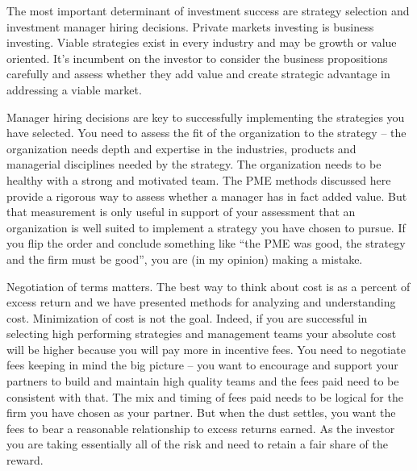 \documentclass[12pt,english]{article}\usepackage[]{graphicx}\usepackage[]{color}
\begin{document}
The most important determinant of investment success are strategy
selection and investment manager hiring decisions. Private markets
investing is business investing. Viable strategies exist in every
industry and may be growth or value oriented. It's incumbent on the
investor to consider the business propositions carefully and assess
whether they add value and create strategic advantage in addressing
a viable market.

Manager hiring decisions are key to successfully implementing the
strategies you have selected. You need to assess the fit of the organization
to the strategy -- the organization needs depth and expertise in
the industries, products and managerial disciplines needed by the
strategy. The organization needs to be healthy with a strong and motivated
team. The PME methods discussed here provide a rigorous way to assess
whether a manager has in fact added value. But that measurement is
only useful in support of your assessment that an organization is
well suited to implement a strategy you have chosen to pursue. If
you flip the order and conclude something like ``the PME was good,
the strategy and the firm must be good'', you are (in my opinion)
making a mistake.

Negotiation of terms matters. The best way to think about cost is
as a percent of excess return and we have presented methods for analyzing
and understanding cost. Minimization of cost is not the goal. Indeed,
if you are successful in selecting high performing strategies and
management teams your absolute cost will be higher because you will
pay more in incentive fees. You need to negotiate fees keeping in
mind the big picture -- you want to encourage and support your partners
to build and maintain high quality teams and the fees paid need to
be consistent with that. The mix and timing of fees paid needs to
be logical for the firm you have chosen as your partner. But when
the dust settles, you want the fees to bear a reasonable relationship
to excess returns earned. As the investor you are taking essentially
all of the risk and need to retain a fair share of the reward.
\end{document}
